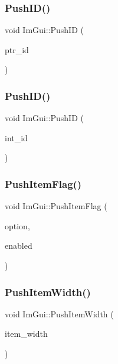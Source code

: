\subsubsection{\texorpdfstring{Push\+I\+D()}{PushID()}\hspace{0.1cm}{\footnotesize\ttfamily [3/4]}}
{\footnotesize\ttfamily void Im\+Gui\+::\+Push\+ID (\begin{DoxyParamCaption}\item[{const void $\ast$}]{ptr\+\_\+id }\end{DoxyParamCaption})}

\hypertarget{namespace_im_gui_a6a11664be2a0b9a0e7054bb339e009ac}{}\label{namespace_im_gui_a6a11664be2a0b9a0e7054bb339e009ac} 
\subsubsection{\texorpdfstring{Push\+I\+D()}{PushID()}\hspace{0.1cm}{\footnotesize\ttfamily [4/4]}}
{\footnotesize\ttfamily void Im\+Gui\+::\+Push\+ID (\begin{DoxyParamCaption}\item[{int}]{int\+\_\+id }\end{DoxyParamCaption})}

\hypertarget{namespace_im_gui_ac7301f6378333f6d17f47823eed9e00a}{}\label{namespace_im_gui_ac7301f6378333f6d17f47823eed9e00a} 
\subsubsection{\texorpdfstring{Push\+Item\+Flag()}{PushItemFlag()}}
{\footnotesize\ttfamily void Im\+Gui\+::\+Push\+Item\+Flag (\begin{DoxyParamCaption}\item[{Im\+Gui\+Item\+Flags}]{option,  }\item[{bool}]{enabled }\end{DoxyParamCaption})}

\hypertarget{namespace_im_gui_a4ad13bf38f0521a339133248ef3e3036}{}\label{namespace_im_gui_a4ad13bf38f0521a339133248ef3e3036} 
\subsubsection{\texorpdfstring{Push\+Item\+Width()}{PushItemWidth()}}
{\footnotesize\ttfamily void Im\+Gui\+::\+Push\+Item\+Width (\begin{DoxyParamCaption}\item[{float}]{item\+\_\+width }\end{DoxyParamCaption})}

